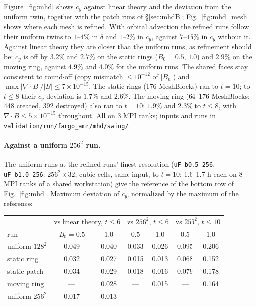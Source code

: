 \documentclass[11pt]{article}
\newcommand{\code}[1]{\texttt{#1}}
\newcommand{\file}[1]{\texttt{\small #1}}
\begin{document}
\noindent
Figure~\ref{fig:mhd} shows $c_y$ against linear theory and the deviation from the
uniform twin, together with the patch runs of \S\ref{sec:mhdB}; Fig.~\ref{fig:mhd_mesh}
shows where each mesh is refined. With orbital advection the
refined runs follow their uniform twins to $1$--$4\%$ in
$\delta$ and $1$--$2\%$ in $c_y$, against $7$--$15\%$ in $c_y$ without it. Against linear
theory they are closer than the uniform runs, as refinement should be: $c_y$ is off by
$3.2\%$ and $2.7\%$ on the static rings ($B_0 = 0.5$, $1.0$) and $2.9\%$ on the moving ring,
against $4.9\%$ and $4.0\%$ for the uniform runs. The shared faces stay consistent to
round-off (copy mismatch $\le 10^{-12}$ of $|B_n|$) and $\max|\nabla\!\cdot\!B|/|B| \le
7\times10^{-15}$. The static rings (176 MeshBlocks) ran to $t = 10$; to $t \le 8$ their
$c_y$ deviation is $1.7\%$ and $2.6\%$. The moving ring (64--176 MeshBlocks; 448 created,
392 destroyed) also ran to $t = 10$: $1.9\%$ and $2.3\%$ to $t \le 8$, with
$\nabla\!\cdot\!B \le 5\times10^{-15}$ throughout. All on 3 MPI ranks; inputs and runs in
\file{validation/run/fargo\_amr/mhd/swing/}.

\paragraph{Against a uniform $256^2$ run.} The uniform runs at the refined runs' finest
resolution (\code{uF\_b0.5\_256}, \code{uF\_b1.0\_256}: $256^2\times32$, cubic cells, same input,
to $t = 10$; 1.6--1.7 h each on 8 MPI ranks of a shared workstation) give the reference of the bottom row of
Fig.~\ref{fig:mhd}. Maximum deviation of $c_y$, normalized by the maximum of the reference:

\begin{center}
\small
\begin{tabular}{@{}lcccccc@{}}
\toprule
& \multicolumn{2}{c}{vs linear theory, $t \le 6$} & \multicolumn{2}{c}{vs $256^2$, $t \le 6$} &
  \multicolumn{2}{c}{vs $256^2$, $t \le 10$} \\
run & $B_0 = 0.5$ & $1.0$ & $0.5$ & $1.0$ & $0.5$ & $1.0$ \\
\midrule
uniform $128^2$ & 0.049 & 0.040 & 0.033 & 0.026 & 0.095 & 0.206 \\
static ring     & 0.032 & 0.027 & 0.015 & 0.013 & 0.068 & 0.152 \\
static patch    & 0.034 & 0.029 & 0.018 & 0.016 & 0.079 & 0.178 \\
moving ring     & ---   & 0.028 & ---   & 0.015 & ---   & 0.164 \\
uniform $256^2$ & 0.017 & 0.013 & ---   & ---   & ---   & ---   \\
\bottomrule
\end{tabular}
\end{center}
\end{document}
